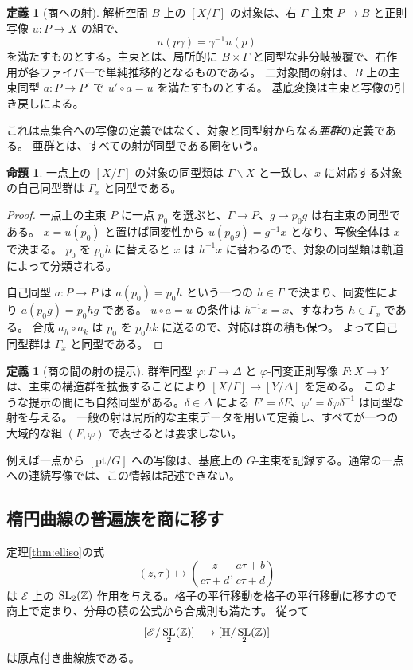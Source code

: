\documentclass[dvipdfmx,a4paper,11pt]{article}
\theoremstyle{definition}
\newtheorem{prop}[thm]{命題}
\newtheorem{dfn}[thm]{定義}
\DeclareMathOperator{\SL}{SL}\DeclareMathOperator{\PGL}{PGL}\DeclareMathOperator{\PSL}{PSL}
\begin{document}
\begin{dfn}[商への射]\label{def:analyticquotient}
解析空間 $B$ 上の $[X/\Gamma]$ の対象は、右 $\Gamma$-主束 $P\to B$ と正則写像 $u:P\to X$ の組で、
\[
u(p\gamma)=\gamma^{-1}u(p)
\]
を満たすものとする。主束とは、局所的に $B\times\Gamma$ と同型な非分岐被覆で、右作用が各ファイバーで単純推移的となるものである。
二対象間の射は、$B$ 上の主束同型 $a:P\to P'$ で $u'\circ a=u$ を満たすものとする。
基底変換は主束と写像の引き戻しによる。
\end{dfn}
これは点集合への写像の定義ではなく、対象と同型射からなる\emph{亜群}の定義である。
亜群とは、すべての射が同型である圏をいう。

\begin{prop}
一点上の $[X/\Gamma]$ の対象の同型類は $\Gamma\backslash X$ と一致し、$x$ に対応する対象の自己同型群は $\Gamma_x$ と同型である。
\end{prop}
\begin{proof}
一点上の主束 $P$ に一点 $p_0$ を選ぶと、$\Gamma\to P$、$g\mapsto p_0g$ は右主束の同型である。
$x=u(p_0)$ と置けば同変性から $u(p_0g)=g^{-1}x$ となり、写像全体は $x$ で決まる。
$p_0$ を $p_0h$ に替えると $x$ は $h^{-1}x$ に替わるので、対象の同型類は軌道によって分類される。

自己同型 $a:P\to P$ は $a(p_0)=p_0h$ という一つの $h\in\Gamma$ で決まり、同変性により $a(p_0g)=p_0hg$ である。
$u\circ a=u$ の条件は $h^{-1}x=x$、すなわち $h\in\Gamma_x$ である。
合成 $a_h\circ a_k$ は $p_0$ を $p_0hk$ に送るので、対応は群の積も保つ。
よって自己同型群は $\Gamma_x$ と同型である。
\end{proof}
\begin{dfn}[商の間の射の提示]
群準同型 $\varphi:\Gamma\to\Delta$ と $\varphi$-同変正則写像 $F:X\to Y$ は、主束の構造群を拡張することにより $[X/\Gamma]\to[Y/\Delta]$ を定める。
このような提示の間にも自然同型がある。$\delta\in\Delta$ による
$F'=\delta F$、$\varphi'=\delta\varphi\delta^{-1}$ は同型な射を与える。
一般の射は局所的な主束データを用いて定義し、すべてが一つの大域的な組 $(F,\varphi)$ で表せるとは要求しない。
\end{dfn}
例えば一点から $[\mathrm{pt}/G]$ への写像は、基底上の $G$-主束を記録する。通常の一点への連続写像では、この情報は記述できない。

\subsection{楕円曲線の普遍族を商に移す}
定理\ref{thm:elliso}の式
\[
(z,\tau)\longmapsto\left(\frac{z}{c\tau+d},\frac{a\tau+b}{c\tau+d}\right)
\]
は $\mathscr E$ 上の $\SL_2(\Z)$ 作用を与える。格子の平行移動を格子の平行移動に移すので商上で定まり、分母の積の公式から合成則も満たす。
従って
\[
[\mathscr E/\SL_2(\Z)]\longrightarrow[\HH/\SL_2(\Z)]
\]
は原点付き曲線族である。
\end{document}
